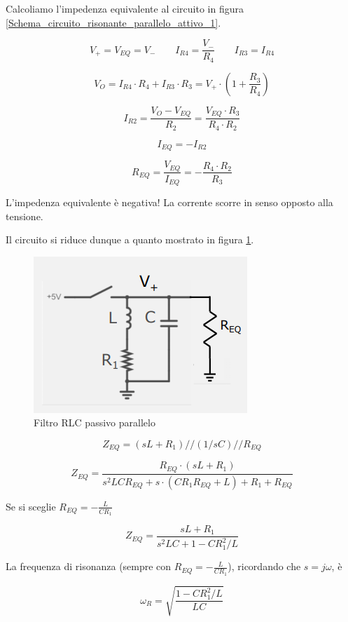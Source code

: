 \documentclass{article}
\begin{document}
Calcoliamo l'impedenza equivalente al circuito in figura \ref{Schema_circuito_risonante_parallelo_attivo_1}.

\[V_+ = V_{EQ} = V_- \quad \quad I_{R4} = \frac{V_-}{R_4} \quad \quad I_{R3} = I_{R4}\]

\[V_O = I_{R4} \cdot R_4 + I_{R3} \cdot R_3 = V_+ \cdot \left(1 + \frac{R_3}{R_4} \right)\]

\[I_{R2} = \frac{V_O - V_{EQ}}{R_2} = \frac{V_{EQ} \cdot R_3}{R_4 \cdot R_2}\]

\[I_{EQ} = - I_{R2}\]

 \[R_{EQ} = \frac{V_{EQ}}{I_{EQ}} = - \frac{R_4 \cdot R_2}{R_3}\]
 
L'impedenza equivalente è negativa! La corrente scorre in senso opposto alla tensione.

\vspace{1mm}

Il circuito si riduce dunque a quanto mostrato in figura \ref{Schema_circuito_risonante_parallelo_attivo_3}.

\begin{figure}[h]
  \centering
  \includegraphics[scale=0.6]{IM_circuito_risonante_parallelo_attivo_3}
  \caption{Filtro RLC passivo parallelo}
  \label{Schema_circuito_risonante_parallelo_attivo_3}
\end{figure}

\[Z_{EQ} = (sL + R_1) // (1/sC) // R_{EQ}\]

\[Z_{EQ} = \frac{R_{EQ} \cdot (sL + R_1)}{s^2 LCR_{EQ} + s \cdot (CR_1 R_{EQ} + L) + R_1 +R_{EQ}}\]

Se si sceglie $R_{EQ} = - \frac{L}{CR_1}$

\[Z_{EQ} = \frac{sL + R_1}{s^2 LC + 1 - C R_1^2/L}\]

La frequenza di risonanza (sempre con $R_{EQ} = - \frac{L}{CR_1}$), ricordando che $s = j\omega$, è

\[\omega_R = \sqrt{\frac{1 - C R_1^2/L}{LC}}\]
\end{document}
